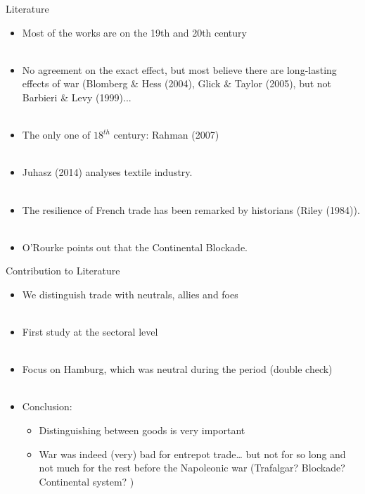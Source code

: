 \documentclass[11pt]{beamer}
\begin{document}
\begin{frame}{Literature}
\begin{itemize}
\item{Most of the works are on the 19th and 20th century}\\~\\
\item{No agreement on the exact effect, but most believe there are long-lasting effects of war (Blomberg \& Hess (2004), Glick \& Taylor (2005), but not Barbieri \& Levy (1999)...}\\~\\
\item{The only one of $18^{th}$ century: Rahman (2007)}\\~\\
\item{Juhasz (2014) analyses textile industry. }\\~\\
\item{The resilience of French trade has been remarked by historians (Riley (1984)).}\\~\\
\item{O'Rourke points out that the Continental Blockade.}

\end{itemize}
\end{frame}


\begin{frame}{Contribution to Literature}
\begin{itemize}
\item{We distinguish trade with neutrals, allies and foes}\\~\\
\item{First study at the sectoral level}\\~\\
\item{Focus on Hamburg, which was neutral during the period (double check)}\\~\\
\item{Conclusion:}
\begin{itemize}
\item{Distinguishing between goods is very important}
\item{War was indeed (very) bad for entrepot trade… but not for so long and not much for the rest before the Napoleonic war (Trafalgar? Blockade? Continental system? )}
\end{itemize}
\end{itemize}
\end{frame}
\end{document}
